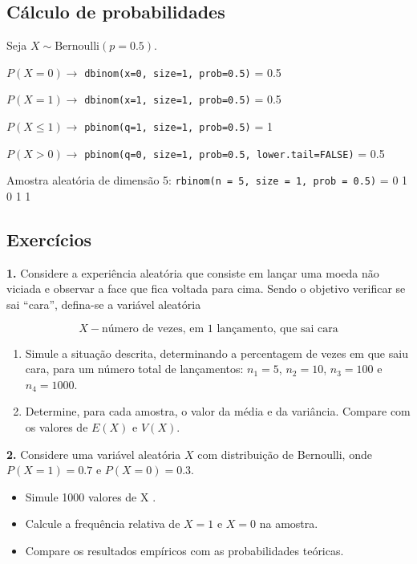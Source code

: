 \documentclass[
]{book}
\providecommand{\tightlist}{%
  \setlength{\itemsep}{0pt}\setlength{\parskip}{0pt}}
\begin{document}
\subsection{Cálculo de probabilidades}\label{cuxe1lculo-de-probabilidades}

Seja \(X \sim \text{Bernoulli}(p=0.5)\).

\(P(X=0) \to\) \texttt{dbinom(x=0,\ size=1,\ prob=0.5)} = 0.5

\(P(X=1) \to\) \texttt{dbinom(x=1,\ size=1,\ prob=0.5)} = 0.5

\(P(X \leq 1) \to\) \texttt{pbinom(q=1,\ size=1,\ prob=0.5)} = 1

\(P(X>0) \to\) \texttt{pbinom(q=0,\ size=1,\ prob=0.5,\ lower.tail=FALSE)} = 0.5

Amostra aleatória de dimensão 5: \texttt{rbinom(n\ =\ 5,\ size\ =\ 1,\ prob\ =\ 0.5)} = 0 1 0 1 1

\subsection{Exercícios}\label{exercuxedcios-25}

\textbf{1.} Considere a experiência aleatória que consiste em lançar
uma moeda não viciada e observar a face que fica voltada para cima.
Sendo o objetivo verificar se sai ``cara'', defina-se a variável aleatória

\[X - \text{número de vezes, em 1 lançamento, que sai cara}\]

\begin{enumerate}
\def\labelenumi{(\alph{enumi})}
\item
  Simule a situação descrita, determinando a percentagem de vezes em que saiu cara, para um número total de lançamentos: \(n_1 = 5\), \(n_2=10\), \(n_3=100\) e \(n_4=1000\).
\item
  Determine, para cada amostra, o valor da média e da variância. Compare com os valores de \(E(X)\) e \(V(X)\).
\end{enumerate}

\textbf{2.} Considere uma variável aleatória \(X\) com distribuição de Bernoulli, onde \(P(X = 1) = 0.7\) e \(P(X = 0) = 0.3\).

\begin{itemize}
\tightlist
\item
  Simule 1000 valores de X .
\item
  Calcule a frequência relativa de \(X = 1\) e \(X = 0\) na amostra.
\item
  Compare os resultados empíricos com as probabilidades teóricas.
\end{itemize}
\end{document}
